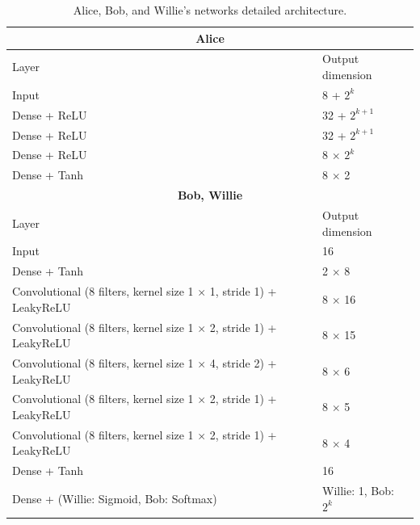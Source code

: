 \begin{table}[tp!]
	\begin{adjustbox}{width=0.9\columnwidth,center}
		\begin{tabular}{|l|l|} 
			\hline
			\multicolumn{2}{|c|}{\textbf{Alice}} 															\\
			\hline
			Layer 																	&	Output dimension	\\
			\hline
			Input      											&	8 + $2^k$    	 		    \\ 
			Dense + ReLU          													&	32 + $2^{k+1}$		\\
			Dense + ReLU          													&	32 + $2^{k+1}$		\\
			Dense + ReLU   															&	8 $\times$ $2^k$	\\
			Dense + Tanh																	&	8 $\times$ 2	\\
			\hline   
			\hline												
			\multicolumn{2}{|c|}{\textbf{Bob, Willie}} 											\\
			\hline
			Layer 																	&	Output dimension	\\
			\hline
			Input  & 16 \\
			Dense + Tanh																&	2 $\times$ 8			\\
			Convolutional (8 filters, kernel size 1 $\times$ 1, stride 1) + LeakyReLU 	&   8 $\times$ 16			\\
			Convolutional (8 filters, kernel size 1 $\times$ 2, stride 1) + LeakyReLU 	&   8 $\times$ 15			\\
			Convolutional (8 filters, kernel size 1 $\times$ 4, stride 2) + LeakyReLU 	&   8 $\times$ 6			\\
			Convolutional (8 filters, kernel size 1 $\times$ 2, stride 1) + LeakyReLU 	&   8 $\times$ 5			\\
			Convolutional (8 filters, kernel size 1 $\times$ 2, stride 1) + LeakyReLU 	&   8 $\times$ 4			\\
			Dense + Tanh																&	16						\\
			Dense + (Willie: Sigmoid, Bob: Softmax)										&	Willie: 1, Bob:	$2^k$	\\
			\hline
		\end{tabular}
	\end{adjustbox}
	\caption{Alice, Bob, and Willie's networks detailed architecture.}
	\label{table:covert_models_structure}
\end{table}

